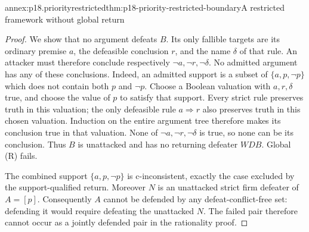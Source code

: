 \begin{annexitem}{annex:p18.priorityrestricted}{thm:p18-priority-restricted-boundary}{A restricted framework without global return}
\begin{proof}
We show that no argument defeats \(B\).
Its only fallible targets are its ordinary premise \(a\), the
defeasible conclusion \(r\), and the name \(\delta\) of that rule.
An attacker must therefore conclude respectively
\(\neg a,\neg r,\neg\delta\).
No admitted argument has any of these conclusions.
Indeed, an admitted support is a subset of \(\{a,p,\neg p\}\)
which does not contain both \(p\) and \(\neg p\).
Choose a Boolean valuation with \(a,r,\delta\) true, and choose the
value of \(p\) to satisfy that support.
Every strict rule preserves truth in this valuation; the only defeasible
rule \(a\Rightarrow r\) also preserves truth in this chosen valuation.
Induction on the entire argument tree therefore makes its conclusion
true in that valuation. None of \(\neg a,\neg r,\neg\delta\) is true,
so none can be its conclusion.
Thus \(B\) is unattacked and has no returning defeater \(W D B\).
Global (R) fails.

The combined support \(\{a,p,\neg p\}\) is c-inconsistent, exactly
the case excluded by the support-qualified return.
Moreover \(N\) is an unattacked strict firm defeater of \(A=[p]\).
Consequently \(A\) cannot be defended by any defeat-conflict-free
set: defending it would require defeating the unattacked \(N\).
The failed pair therefore cannot occur as a jointly defended pair
in the rationality proof.
\end{proof}
\end{annexitem}

